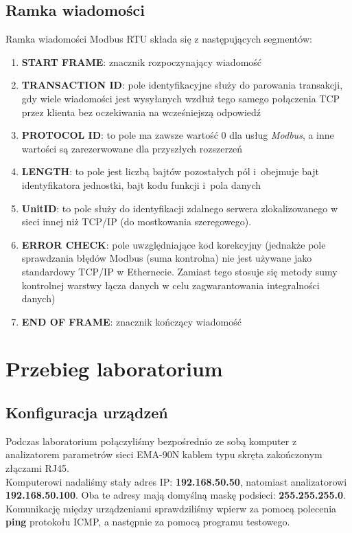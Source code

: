 \documentclass[12pt]{article}
\begin{document}
\subsection{Ramka wiadomości}
Ramka wiadomości Modbus RTU składa się z następujących segmentów:
\begin{enumerate}
    \item \textbf{START FRAME}: znacznik rozpoczynający wiadomość
    \item \textbf{TRANSACTION ID}: pole identyfikacyjne służy do parowania transakcji, gdy wiele wiadomości jest wysyłanych wzdłuż tego samego połączenia TCP przez klienta bez oczekiwania na wcześniejszą odpowiedź
    \item \textbf{PROTOCOL ID}: to pole ma zawsze wartość 0 dla usług \textit{Modbus}, a inne wartości są zarezerwowane dla przyszłych rozszerzeń
    \item \textbf{LENGTH}: to pole jest liczbą bajtów pozostałych pól i~obejmuje
bajt identyfikatora jednostki, bajt kodu funkcji i~pola danych
    \item \textbf{UnitID}: to pole służy do identyfikacji zdalnego serwera zlokalizowanego w sieci innej niż TCP/IP (do mostkowania szeregowego).
    \item \textbf{ERROR CHECK}: pole uwzględniające kod korekcyjny (jednakże
pole sprawdzania błędów Modbus (suma kontrolna) nie jest używane jako standardowy TCP/IP w Ethernecie. Zamiast tego stosuje się metody sumy kontrolnej warstwy łącza danych w celu zagwarantowania integralności danych)
    \item \textbf{END OF FRAME}: znacznik kończący wiadomość
\end{enumerate}


\section{Przebieg laboratorium}
\subsection{Konfiguracja urządzeń}
Podczas laboratorium połączyliśmy bezpośrednio ze sobą komputer z analizatorem parametrów sieci EMA-90N kablem typu skręta zakończonym złączami RJ45.\\
Komputerowi nadaliśmy stały adres IP: \textbf{192.168.50.50}, natomiast analizatorowi \textbf{192.168.50.100}. Oba te adresy mają domyślną maskę podsieci: \textbf{255.255.255.0}. Komunikację między urządzeniami sprawdziliśmy wpierw za pomocą polecenia \textbf{ping} protokołu ICMP, a następnie za pomocą programu testowego\cite{test}.
\end{document}

